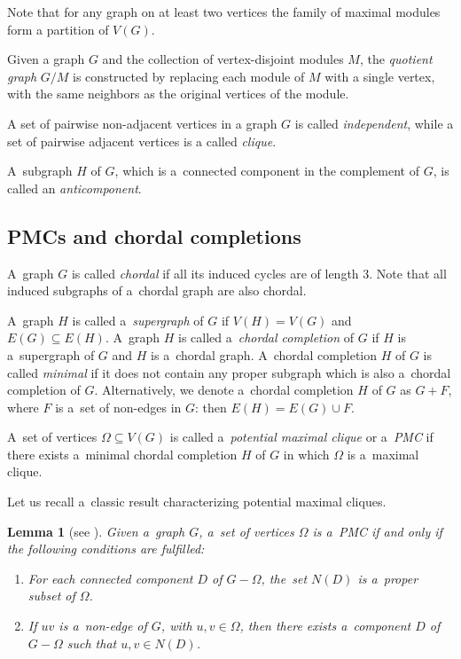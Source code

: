 \documentclass[11pt,a4paper]{article}
\newtheorem{lemma}[theorem]{Lemma}
\theoremstyle{definition}
\newcommand{\Jadwiga}[2][]{\todo[color=yellow!80,inline,#1]{{\textbf{J:} #2}}}
\newcommand{\prz}[2][]{\todo[color=olive!80,#1]{{\textbf{prz:} #2}}}
\begin{document}
Note that for any graph on at least two vertices the family of maximal modules form a partition of $V(G)$.

Given a graph $G$ and the collection of vertex-disjoint modules $M$, the {\it quotient graph} $G/M$ is constructed by replacing each module of $M$ with a single vertex, with the same neighbors as the original vertices of the module. 


A set of pairwise non-adjacent vertices in a graph $G$ is called \emph{independent}, while a set of pairwise adjacent vertices is a called \emph{clique}.

A~subgraph $H$ of $G$, which is a~connected component in the complement of $G$, is called an {\it anticomponent}.

\subsection{PMCs and chordal completions}
A~graph $G$ is called {\it chordal} if all its induced cycles are of length $3$. Note that all induced subgraphs of a~chordal graph are also chordal. 

A~graph $H$ is called a~{\it supergraph} of $G$ if $V(H)=V(G)$ and $E(G)\subseteq E(H)$. A~graph $H$ is called a~{\it chordal completion} of $G$ if $H$ is a~supergraph of $G$ and $H$ is a~chordal graph. A~chordal completion $H$ of $G$ is called {\it minimal} if it does not contain any proper subgraph which is also a~chordal completion of $G$. Alternatively, we denote a~chordal completion $H$ of $G$ as $G+F$, where $F$ is a~set of non-edges in $G$: then $E(H)=E(G)\cup F$.

A~set of vertices $\Omega\subseteq V(G)$ is called a~{\it potential maximal clique} or a~{\it PMC} if there exists a~minimal chordal completion $H$  of $G$ in which $\Omega$ is a~maximal clique. 

Let us recall a~classic result characterizing potential maximal cliques.
\begin{lemma}[see \cite{Todinca}]\label{lem:PMC_basic}
Given a~graph $G$, a~set of vertices $\Omega$ is a~PMC if and only if the following conditions are fulfilled:
\begin{enumerate}
    \item For each connected component $D$ of $G-\Omega$, the~set $N(D)$ is a~proper subset of $\Omega$.
    \item If $uv$ is a~non-edge of $G$, with $u,v\in\Omega$, then there exists a~component $D$ of $G-\Omega$ such that $u,v\in N(D)$.
\end{enumerate}
\end{lemma}
\end{document}
